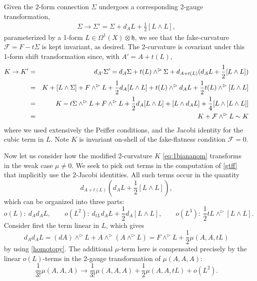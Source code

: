 \documentclass[onecolumn]{article}
\theoremstyle{theorem}
\theoremstyle{remark}
\theoremstyle{example}
\theoremstyle{definition}
\numberwithin{equation}{section}
\newcommand{\cF}{{\cal F}}
\begin{document}
Given the 2-form connection $\Sigma$ undergoes a corresponding 2-gauge transformation, %
\begin{align}\label{2gau}
\Sigma\rightarrow \Sigma'=\Sigma + d_AL + \frac{1}{2}[L\wedge L],
\end{align}
parameterized by a 1-form $L\in \Omega^1(X)\otimes\mathfrak{h}$, we see that the fake-curvature $\mathcal{F}=F-t\Sigma$ is kept invariant, as desired.
The 2-curvature is covariant under this 1-form shift transformation since, with $A'=A+t(L)$, 
\begin{eqnarray}
    K \rightarrow K' &=& d_{A'}\Sigma' = d_A\Sigma +t(L)\wedge^\rhd \Sigma + d_{A+t(L)} (d_AL + \frac{1}{2}[L\wedge L])\nonumber\\
    &=& K+ [L\wedge \Sigma] +F\wedge ^\rhd L + \frac{1}{2}d_A [L\wedge L] + t(L) \wedge^\rhd d_AL + \frac{1}{2} t(L) \wedge^\rhd [L\wedge L]\nonumber\\
     &=& K- t\Sigma\wedge^\rhd L +F \wedge^\rhd  L  + \frac{1}{2}d_A [L\wedge L] + [L \wedge  d_AL] + \frac{1}{4} [L \wedge [L\wedge L]]\nonumber\\
     &=& K + \cF \wedge^\rhd L \sim K\label{gtff}
\end{eqnarray}
where we used extensively the Peiffer conditions, and the Jacobi identity for the cubic term in $L$. Note $K$ is invariant {on-shell} of the fake-flatness condition $\mathcal{F}=0$.


Now let us consider how the modified 2-curvature $K$  \eqref{eq:1biananom} transforms in the weak case $\mu\neq 0$. We seek to pick out terms in the computation of  \eqref{gtff} that implicitly use the 2-Jacobi identities. All such terms occur in the quantity
\begin{equation}
    d_{A+t(L)} (d_AL + \frac{1}{2}[L\wedge L]),\nonumber
\end{equation}
which can be organized into three parts:
\begin{equation}
    o(L):~ d_Ad_AL,\qquad o(L^2):~ d_{tL}d_AL + \frac{1}{2}d_A[L\wedge L],\qquad o(L^3):~ \frac{1}{2}tL\wedge^\rhd [L\wedge L].\nonumber
\end{equation}
{Consider} first the term linear in $L$, which gives
\begin{equation}
    d_Ad_AL = (dA)\wedge^\rhd L + A\wedge^\rhd(A\wedge^\rhd L)= F\wedge^\rhd L + \frac{1}{2}\mu(A,A,tL)\nonumber
\end{equation}
by using  \eqref{homotopy}. The additional $\mu$-term here is compensated precisely by the linear $o(L)$-terms in the 2-gauge transformation of $\mu(A,A,A)$:
\begin{equation}
    \frac{1}{3!}\mu(A,A,A)\rightarrow \frac{1}{3!}\mu(A,A,A) + \frac{1}{2}\mu(A,A,tL)+o(L^2).\nonumber
\end{equation}
\end{document}
